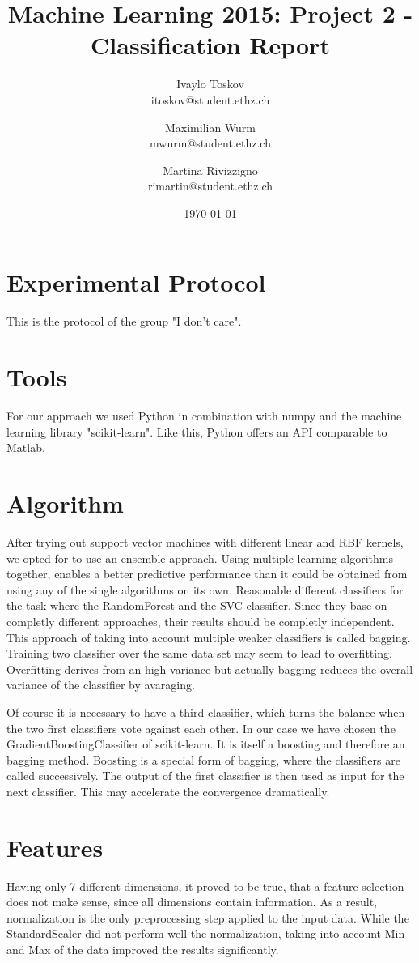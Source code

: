 \documentclass[a4paper, 11pt]{article}
\title{Machine Learning 2015: Project 2 - Classification Report}
\author{Ivaylo Toskov \\ itoskov@student.ethz.ch \and Maximilian Wurm \\ mwurm@student.ethz.ch \and 
	Martina Rivizzigno \\ rimartin@student.ethz.ch\\}
\date{\today}
\begin{document}
\maketitle

\section*{Experimental Protocol}
This is the protocol of the group "I don't care".

\section{Tools}
For our approach we used Python in combination with numpy and the machine learning library "scikit-learn". Like this, Python offers an API comparable to Matlab.

\section{Algorithm}
After trying out support vector machines with different linear and RBF kernels, we opted for to use an ensemble approach. Using multiple learning algorithms together, enables a better predictive performance than it could be obtained from using any of the single algorithms on its own. Reasonable different classifiers for the task where the RandomForest and the SVC classifier. Since they base on completly different approaches, their results should be completly independent. 
This approach of taking into account multiple weaker classifiers is called bagging. Training two classifier over the same data set may seem to lead to overfitting. Overfitting derives from an high variance but actually bagging reduces the overall variance of the classifier by avaraging. 

Of course it is necessary to have a third classifier, which turns the balance when the two first classifiers vote against each other. In our case we have chosen the  GradientBoostingClassifier of scikit-learn. It is itself a boosting and therefore an bagging method. Boosting is a special form of bagging, where the classifiers are called successively. The output of the first classifier is then used as input for the next classifier. This may accelerate the convergence dramatically. 

\section{Features}
Having only 7 different dimensions, it proved to be true, that a feature selection does not make sense, since all dimensions contain information. As a result, normalization is the only preprocessing step applied to the input data. While the StandardScaler did not perform well the normalization, taking into account Min and Max of the data improved the results significantly. 
\end{document}
